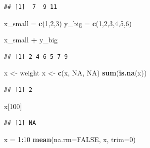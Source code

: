 \documentclass[]{article}
\newenvironment{Shaded}{\begin{snugshade}}{\end{snugshade}}
\newcommand{\KeywordTok}[1]{\textcolor[rgb]{0.13,0.29,0.53}{\textbf{#1}}}
\newcommand{\DataTypeTok}[1]{\textcolor[rgb]{0.13,0.29,0.53}{#1}}
\newcommand{\DecValTok}[1]{\textcolor[rgb]{0.00,0.00,0.81}{#1}}
\newcommand{\StringTok}[1]{\textcolor[rgb]{0.31,0.60,0.02}{#1}}
\newcommand{\OtherTok}[1]{\textcolor[rgb]{0.56,0.35,0.01}{#1}}
\newcommand{\OperatorTok}[1]{\textcolor[rgb]{0.81,0.36,0.00}{\textbf{#1}}}
\newcommand{\NormalTok}[1]{#1}
\begin{document}
\begin{verbatim}
## [1]  7  9 11
\end{verbatim}

\begin{Shaded}
\begin{Highlighting}[]
\NormalTok{x_small =}\StringTok{ }\KeywordTok{c}\NormalTok{(}\DecValTok{1}\NormalTok{,}\DecValTok{2}\NormalTok{,}\DecValTok{3}\NormalTok{)}
\NormalTok{y_big =}\StringTok{ }\KeywordTok{c}\NormalTok{(}\DecValTok{1}\NormalTok{,}\DecValTok{2}\NormalTok{,}\DecValTok{3}\NormalTok{,}\DecValTok{4}\NormalTok{,}\DecValTok{5}\NormalTok{,}\DecValTok{6}\NormalTok{)}
 
\NormalTok{x_small }\OperatorTok{+}\StringTok{ }\NormalTok{y_big}
\end{Highlighting}
\end{Shaded}

\begin{verbatim}
## [1] 2 4 6 5 7 9
\end{verbatim}

\begin{Shaded}
\begin{Highlighting}[]
\NormalTok{x <-}\StringTok{ }\NormalTok{weight}
\NormalTok{x <-}\StringTok{ }\KeywordTok{c}\NormalTok{(x, }\OtherTok{NA}\NormalTok{, }\OtherTok{NA}\NormalTok{)}
\KeywordTok{sum}\NormalTok{(}\KeywordTok{is.na}\NormalTok{(x))}
\end{Highlighting}
\end{Shaded}

\begin{verbatim}
## [1] 2
\end{verbatim}

\begin{Shaded}
\begin{Highlighting}[]
\NormalTok{x[}\DecValTok{100}\NormalTok{]}
\end{Highlighting}
\end{Shaded}

\begin{verbatim}
## [1] NA
\end{verbatim}

\begin{Shaded}
\begin{Highlighting}[]
\NormalTok{x =}\StringTok{ }\DecValTok{1}\OperatorTok{:}\DecValTok{10}
\KeywordTok{mean}\NormalTok{(}\DataTypeTok{na.rm=}\OtherTok{FALSE}\NormalTok{, x, }\DataTypeTok{trim=}\DecValTok{0}\NormalTok{)}
\end{Highlighting}
\end{Shaded}
\end{document}

